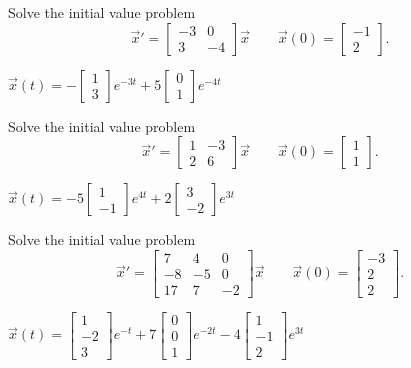 \begin{exercise}
Solve the initial value problem
\[ {\vec{x}}' = \begin{bmatrix} -3 & 0 \\ 3 & -4 \end{bmatrix} \vec{x} \qquad \vec{x}(0) = \begin{bmatrix} -1 \\ 2 \end{bmatrix}. \]
\end{exercise}
\comboSol{%
}
{%
$\vec{x}(t) = -\left[\begin{smallmatrix} 1 \\ 3 \end{smallmatrix}\right]e^{-3t} + 5\left[\begin{smallmatrix} 0 \\ 1 \end{smallmatrix}\right]e^{-4t}$
}

\begin{exercise}
Solve the initial value problem
\[ {\vec{x}}' = \begin{bmatrix} 1 & -3 \\ 2 & 6 \end{bmatrix} \vec{x} \qquad \vec{x}(0) = \begin{bmatrix} 1 \\ 1 \end{bmatrix}. \]
\end{exercise}
\comboSol{%
}
{%
$\vec{x}(t) = -5\left[\begin{smallmatrix} 1 \\ -1 \end{smallmatrix}\right]e^{4t} + 2\left[\begin{smallmatrix} 3 \\ -2 \end{smallmatrix}\right]e^{3t}$
}

\begin{exercise}
Solve the initial value problem
\[ {\vec{x}}' = \begin{bmatrix} 7 & 4 & 0 \\ -8 & -5 & 0 \\ 17 & 7 & -2 \end{bmatrix} \vec{x} \qquad \vec{x}(0) = \begin{bmatrix} -3 \\ 2 \\ 2 \end{bmatrix}. \]
\end{exercise}
\comboSol{%
}
{%
$\vec{x}(t) = \left[\begin{smallmatrix} 1 \\ -2 \\ 3 \end{smallmatrix}\right]e^{-t} + 7\left[\begin{smallmatrix} 0 \\ 0 \\ 1 \end{smallmatrix}\right]e^{-2t} - 4\left[\begin{smallmatrix} 1 \\ -1 \\ 2 \end{smallmatrix}\right]e^{3t}$
}




